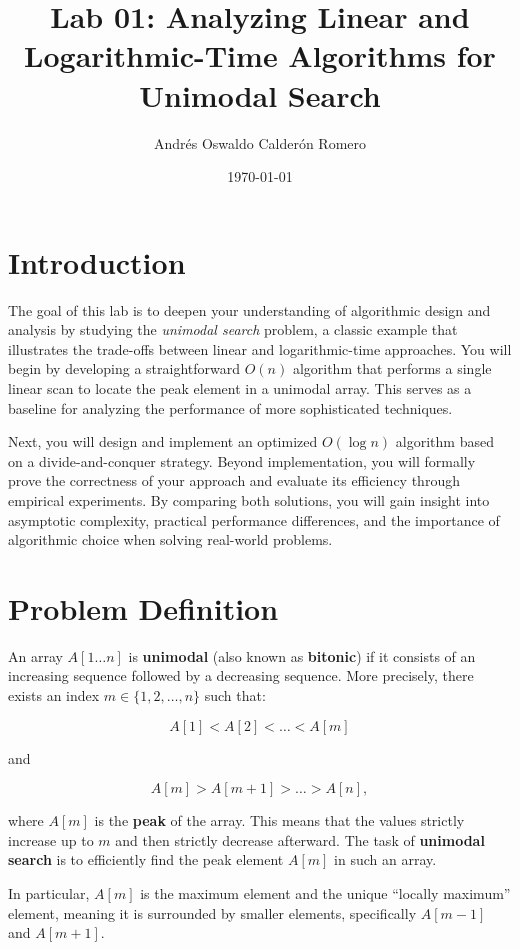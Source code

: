 \documentclass{article}
\title{Lab 01: Analyzing Linear and Logarithmic-Time Algorithms for Unimodal Search}
\author{Andrés Oswaldo Calderón Romero}
\date{\today}
\begin{document}
\maketitle

\section{Introduction}
The goal of this lab is to deepen your understanding of algorithmic design and analysis by studying the \textit{unimodal search} problem, a classic example that illustrates the trade-offs between linear and logarithmic-time approaches. You will begin by developing a straightforward $O(n)$ algorithm that performs a single linear scan to locate the peak element in a unimodal array. This serves as a baseline for analyzing the performance of more sophisticated techniques.

Next, you will design and implement an optimized $O(\log n)$ algorithm based on a divide-and-conquer strategy. Beyond implementation, you will formally prove the correctness of your approach and evaluate its efficiency through empirical experiments. By comparing both solutions, you will gain insight into asymptotic complexity, practical performance differences, and the importance of algorithmic choice when solving real-world problems.


\section{Problem Definition}
An array $A[1 \ldots n]$ is \textbf{unimodal} (also known as \textbf{bitonic}) if it consists of an increasing sequence followed by a decreasing sequence. More precisely, there exists an index $m \in \{1, 2, \ldots, n\}$ such that:

$$
A[1] < A[2] < \dots < A[m]
$$

and

$$
A[m] > A[m+1] > \dots > A[n],
$$

where $A[m]$ is the \textbf{peak} of the array. This means that the values strictly increase up to $m$ and then strictly decrease afterward. The task of \textbf{unimodal search} is to efficiently find the peak element $A[m]$ in such an array.

In particular, $A[m]$ is the maximum element and the unique ``locally maximum'' element, meaning it is surrounded by smaller elements, specifically $A[m - 1]$ and $A[m + 1]$.
\end{document}
